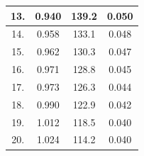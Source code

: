 \documentclass[a4paper,12pt]{article}
\begin{document}
\begin{table}[H]
{\begin{tabular}{|c|c|c|c|}
		13.                                                       & 0.940                                                                 & 139.2                                                                     & 0.050                                                                  \\ \hline
		14.                                                       & 0.958                                                                 & 133.1                                                                     & 0.048                                                                  \\ \hline
		15.                                                       & 0.962                                                                 & 130.3                                                                     & 0.047                                                                  \\ \hline
		16.                                                       & 0.971                                                                 & 128.8                                                                     & 0.045                                                                  \\ \hline
		17.                                                       & 0.973                                                                 & 126.3                                                                     & 0.044                                                                  \\ \hline
		18.                                                       & 0.990                                                                 & 122.9                                                                     & 0.042                                                                  \\ \hline
		19.                                                       & 1.012                                                                 & 118.5                                                                     & 0.040                                                                  \\ \hline
		20.                                                       & 1.024                                                                 & 114.2                                                                     & 0.040                                                                  \\ \hline

\end{tabular}}
\end{table}
\end{document}
